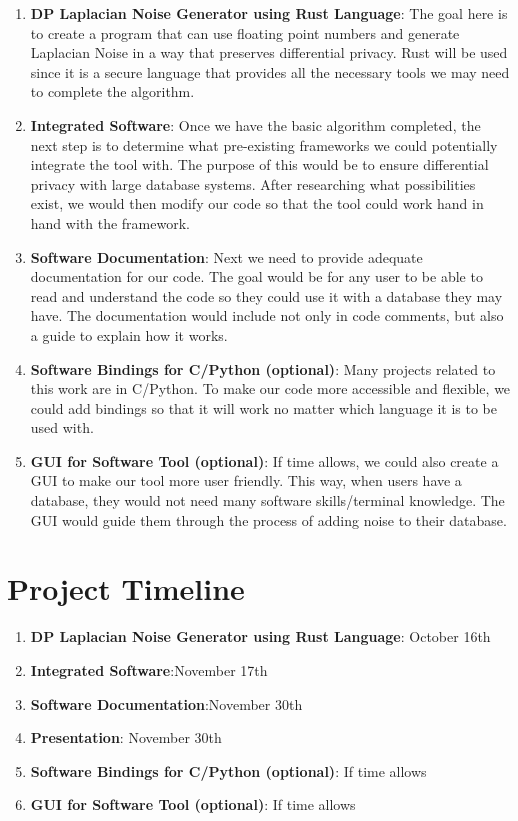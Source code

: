 \documentclass[11pt]{exam}
\begin{document}
\begin{enumerate}
    \item \textbf{DP Laplacian Noise Generator using Rust Language}: The goal here is to create a program that can use floating point numbers and generate Laplacian Noise in a way that preserves differential privacy. Rust will be used since it is a secure language that provides all the necessary tools we may need to complete the algorithm.
        
    \item \textbf{Integrated Software}: Once we have the basic algorithm completed, the next step is to determine what pre-existing frameworks we could potentially integrate the tool with. The purpose of this would be to ensure differential privacy with large database systems. After researching what possibilities exist, we would then modify our code so that the tool could work hand in hand with the framework.
    \item \textbf{Software Documentation}: Next we need to provide adequate documentation for our code. The goal would be for any user to be able to read and understand the code so they could use it with a database they may have. The documentation would include not only in code comments, but also a guide to explain how it works.
    \item \textbf{Software Bindings for C/Python (optional)}: Many projects related to this work are in C/Python. To make our code more accessible and flexible, we could add bindings so that it will work no matter which language it is to be used with. 
    \item \textbf{GUI for Software Tool (optional)}: If time allows, we could also create a GUI to make our tool more user friendly. This way, when users have a database, they would not need many software skills/terminal knowledge. The GUI would guide them through the process of adding noise to their database.
\end{enumerate}

\section{Project Timeline}
\begin{enumerate}
    \item \textbf{DP Laplacian Noise Generator using Rust Language}: October 16th
    \item \textbf{Integrated Software}:November 17th
    \item \textbf{Software Documentation}:November 30th
    \item \textbf{Presentation}: November 30th
    \item \textbf{Software Bindings for C/Python (optional)}: If time allows
     \item \textbf{GUI for Software Tool (optional)}: If time allows
\end{enumerate}
    
    


\end{document}
